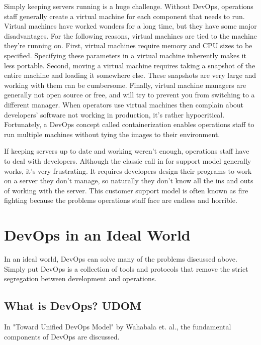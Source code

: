 \documentclass[titlepage]{article}
\begin{document}
Simply keeping servers running is a huge challenge. Without DevOps, operations staff generally create a virtual machine for each component that needs to run. Virtual machines have worked wonders for a long time, but they have some major disadvantages. For the following reasons, virtual machines are tied to the machine they're running on. First, virtual machines require memory and CPU sizes to be specified. Specifying these parameters in a virtual machine inherently makes it less portable. Second, moving a virtual machine requires taking a snapshot of the entire machine and loading it somewhere else. These snapshots are very large and working with them can be cumbersome. Finally, virtual machine managers are generally not open source or free, and will try to prevent you from switching to a different manager. When operators use virtual machines then complain about developers' software not working in production, it's rather hypocritical. Fortunately, a DevOps concept called containerization enables operations staff to run multiple machines without tying the images to their environment.

If keeping servers up to date and working weren't enough, operations staff have to deal with developers. Although the classic call in for support model generally works, it's very frustrating. It requires developers design their programs to work on a server they don't manage, so naturally they don't know all the ins and outs of working with the server. This customer support model is often known as fire fighting because the problems operations staff face are endless and horrible.

\section{DevOps in an Ideal World}

In an ideal world, DevOps can solve many of the problems discussed above. Simply put DevOps is a collection of tools and protocols that remove the strict segregation between development and operations.

\subsection{What is DevOps? UDOM}

In "Toward Unified DevOps Model" by Wahabala et. al., the fundamental components of DevOps are discussed. 

\cite[]{udom.7339039}
\end{document}
